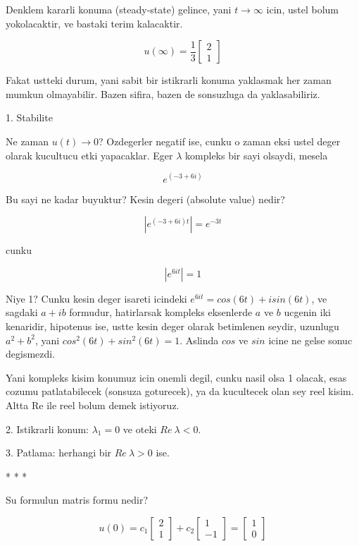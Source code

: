 \documentclass[12pt,fleqn]{article}\usepackage{../common}
\begin{document}
Denklem kararli konuma (steady-state) gelince, yani $t \rightarrow \infty$ icin,
ustel bolum yokolacaktir, ve bastaki terim kalacaktir. 

\[ u(\infty) =
\frac{1}{3}
\left[\begin{array}{c}
2 \\ 1
\end{array}\right]
 \]

Fakat ustteki durum, yani sabit bir istikrarli konuma yaklasmak her zaman
mumkun olmayabilir. Bazen sifira, bazen de sonsuzluga da yaklasabiliriz. 

1. Stabilite 

Ne zaman $u(t) \rightarrow 0$? Ozdegerler negatif ise, cunku o zaman eksi
ustel deger olarak kucultucu etki yapacaklar. Eger $\lambda$ kompleks bir
sayi olsaydi, mesela 

\[ e^{(-3 + 6i)} \]

Bu sayi ne kadar buyuktur? Kesin degeri (absolute value) nedir? 

\[ | e^{(-3 + 6i)t}| = e^{-3t} \]

cunku 

\[ |e^{6it}| = 1 \]

Niye 1? Cunku kesin deger isareti icindeki $e^{6it} = cos(6t)+isin(6t)$, ve
sagdaki $a+ib$ formudur, hatirlarsak kompleks eksenlerde $a$ ve $b$ ucgenin
iki kenaridir, hipotenus ise, ustte kesin deger olarak betimlenen seydir,
uzunlugu $a^2 + b^2$, yani $cos^2(6t) + sin^2(6t) = 1$. Aslinda $cos$ ve
$sin$ icine ne gelse sonuc degismezdi. 

Yani kompleks kisim konumuz icin onemli degil, cunku nasil olsa 1 olacak,
esas cozumu patlatabilecek (sonsuza goturecek), ya da kucultecek olan sey
reel kisim. Altta Re ile reel bolum demek istiyoruz.

2. Istikrarli konum: $\lambda_1 = 0$ ve oteki $Re \ \lambda < 0$. 

3. Patlama: herhangi bir $Re \ \lambda > 0$ ise. 

* * * 

Su formulun matris formu nedir?

\[ u(0) =
c_1 
\left[\begin{array}{c}
2 \\ 1
\end{array}\right]
+
c_2 
\left[\begin{array}{c}
1 \\ -1
\end{array}\right] 
=
\left[\begin{array}{c}
1 \\ 0
\end{array}\right] 
\]
\end{document}
